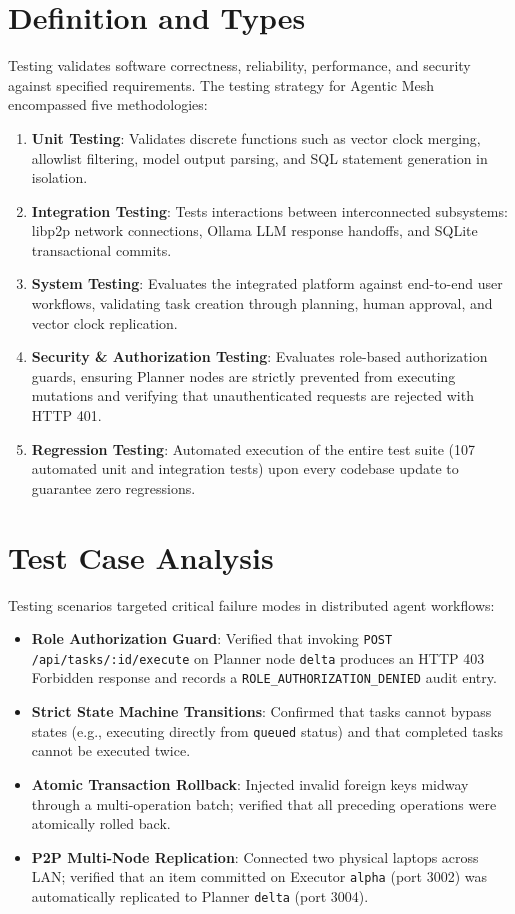 \documentclass[12pt,a4paper]{report}
\begin{document}
\section{Definition and Types}
Testing validates software correctness, reliability, performance, and security against specified requirements. The testing strategy for Agentic Mesh encompassed five methodologies:
\begin{enumerate}[label=\roman*.,leftmargin=*,itemsep=3pt]
    \item \textbf{Unit Testing}: Validates discrete functions such as vector clock merging, allowlist filtering, model output parsing, and SQL statement generation in isolation.
    \item \textbf{Integration Testing}: Tests interactions between interconnected subsystems: libp2p network connections, Ollama LLM response handoffs, and SQLite transactional commits.
    \item \textbf{System Testing}: Evaluates the integrated platform against end-to-end user workflows, validating task creation through planning, human approval, and vector clock replication.
    \item \textbf{Security \& Authorization Testing}: Evaluates role-based authorization guards, ensuring Planner nodes are strictly prevented from executing mutations and verifying that unauthenticated requests are rejected with HTTP 401.
    \item \textbf{Regression Testing}: Automated execution of the entire test suite (107 automated unit and integration tests) upon every codebase update to guarantee zero regressions.
\end{enumerate}

\section{Test Case Analysis}
Testing scenarios targeted critical failure modes in distributed agent workflows:
\begin{itemize}[leftmargin=*,itemsep=2pt]
    \item \textbf{Role Authorization Guard}: Verified that invoking \texttt{POST /api/tasks/:id/execute} on Planner node \texttt{delta} produces an HTTP 403 Forbidden response and records a \texttt{ROLE\_AUTHORIZATION\_DENIED} audit entry.
    \item \textbf{Strict State Machine Transitions}: Confirmed that tasks cannot bypass states (e.g., executing directly from \texttt{queued} status) and that completed tasks cannot be executed twice.
    \item \textbf{Atomic Transaction Rollback}: Injected invalid foreign keys midway through a multi-operation batch; verified that all preceding operations were atomically rolled back.
    \item \textbf{P2P Multi-Node Replication}: Connected two physical laptops across LAN; verified that an item committed on Executor \texttt{alpha} (port 3002) was automatically replicated to Planner \texttt{delta} (port 3004).
\end{itemize}
\end{document}
